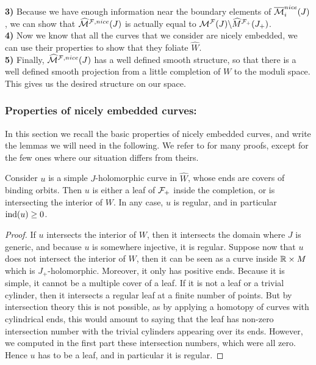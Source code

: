 \documentclass[../main.tex]{subfiles}
\begin{document}
\textbf{3)} Because we have enough information near the boundary elements of $\overline{\mathcal{M}}_i^{nice}(J)$, we can show that $\widehat{\mathcal{M}}^{\mathcal{F},nice}(J)$ is actually equal to $\mathcal{M}^{\mathcal{F}}(J)\backslash\widehat{M}^{\mathcal{F}_+}(J_+)$.\\

\textbf{4)} Now we know that all the curves that we consider are nicely embedded, we can use their properties to show that they foliate $\widehat{W}$.\\

\textbf{5)} Finally, $\widehat{\mathcal{M}}^{\mathcal{F},nice}(J)$ has a well defined smooth structure, so that there is a well defined smooth projection from a little completion of $W$ to the moduli space. This gives us the desired structure on our space. 


\subsubsection{Properties of nicely embedded curves:}

In this section we recall the basic properties of nicely embedded curves, and write the lemmas we will need in the following. We refer to \cite{SOBD2} for many proofs, except for the few ones where our situation differs from theirs.\\

\begin{lemma}
Consider $u$ is a simple $J$-holomorphic curve in $\widehat{W}$, whose ends are covers of binding orbits. Then $u$ is either a leaf of $\mathcal{F}_ +$ inside the completion, or is intersecting the interior of $W$. In any case, $u$ is regular, and in particular $\text{ind}(u) \geq 0$.
\end{lemma}

\begin{proof}
If $u$ intersects the interior of $W$, then it intersects the domain where $J$ is generic, and because $u$ is somewhere injective, it is regular. Suppose now that $u$ does not intersect the interior of $W$, then it can be seen as a curve inside $\mathbb{R}\times M$ which is $J_+$-holomorphic. Moreover, it only has positive ends. Because it is simple, it cannot be a multiple cover of a leaf. If it is not a leaf or a trivial cylinder, then it intersects a regular leaf at a finite number of points. But by intersection theory this is not possible, as by applying a homotopy of curves with cylindrical ends, this would amount to saying that the leaf has non-zero intersection number with the trivial cylinders appearing over its ends. However, we computed in the first part these intersection numbers, which were all zero. Hence $u$ has to be a leaf, and in particular it is regular. 


\end{proof}
\end{document}
